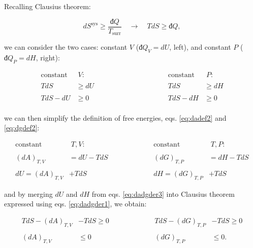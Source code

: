 \documentclass[
  9pt,
]{extbook}
\theoremstyle{definition}
\theoremstyle{definition}
\theoremstyle{definition}
\theoremstyle{remark}
\begin{document}
Recalling Clausius theorem:

\begin{equation}
d S^{\mathrm{sys}} \geq \frac{đQ}{T_{\text{surr}}} \quad \longrightarrow \quad TdS \geq đQ,
\label{eq:dssyscrit}
\end{equation}

we can consider the two cases: constant \(V\) (\(đQ_V=dU\), left), and constant \(P\) (\(đQ_P=dH\), right):

\begin{equation}
\begin{aligned}
\text{constant} & \; V:           & \qquad \qquad & \qquad \qquad &     \text{constant} & \; P: \\
\\
TdS & \geq dU           & &   &     TdS & \geq dH \\
\\
TdS -dU & \geq 0         & &   &      TdS -dH & \geq 0 \\
\end{aligned}
\label{eq:dadgder1}
\end{equation}

we can then simplify the definition of free energies, eqs. \eqref{eq:dadef2} and \eqref{eq:dgdef2}:

\begin{equation}
\begin{aligned}
\text{constant} & \; T,V:           & \qquad & \qquad &     \text{constant} & \; T,P: \\
\\
(dA)_{T,V} &= dU -TdS     & &   &       (dG)_{T,P} &= dH - TdS \\ 
\\
dU = (dA)_{T,V} &+TdS       & &   &       dH = (dG)_{T,P} &+TdS
\end{aligned}
\label{eq:dadgder3}
\end{equation}

and by merging \(dU\) and \(dH\) from eqs. \eqref{eq:dadgder3} into Clausius theorem expressed using eqs. \eqref{eq:dadgder1}, we obtain:

\begin{equation}
\begin{aligned}
TdS -(dA)_{T,V} &- TdS \geq 0 & \qquad & \qquad & TdS -(dG)_{T,P} &- TdS \geq 0 \\
\\
(dA)_{T,V} & \leq 0 & \qquad & \qquad & (dG)_{T,P} & \leq 0. \\
\end{aligned}
\label{eq:dadgcond}
\end{equation}
\end{document}
